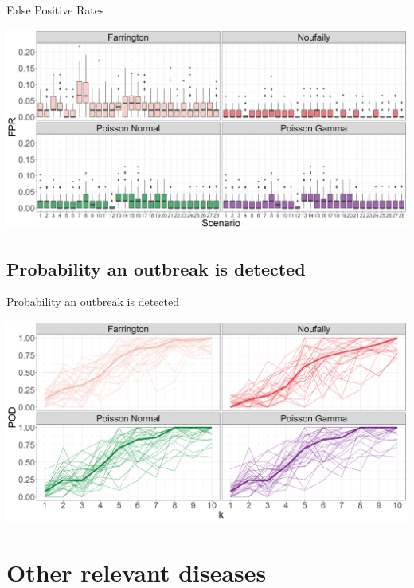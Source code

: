 \documentclass[aspectratio=169]{beamer}
\begin{document}
\begin{frame}{False Positive Rates}
\tiny

\includegraphics[width=1\linewidth]{../figures/FPRPlot}

\normalsize
\end{frame}

\hypertarget{probability-an-outbreak-is-detected}{%
\subsection{Probability an outbreak is
detected}\label{probability-an-outbreak-is-detected}}

\begin{frame}{Probability an outbreak is detected}
\tiny

\includegraphics[width=1\linewidth]{../figures/PropDetect}

\normalsize
\end{frame}

\hypertarget{other-relevant-diseases}{%
\section{Other relevant diseases}\label{other-relevant-diseases}}
\end{document}
